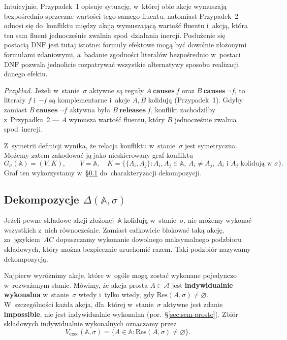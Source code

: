 \documentclass[11pt,a4paper]{article}
\newcommand{\causes}{\textbf{causes}}
\newcommand{\impossible}{\textbf{impossible}}
\newcommand{\releases}{\textbf{releases}}
\newcommand{\DNF}{\mathrm{DNF}}
\theoremstyle{definition}
\begin{document}
\medskip
Intuicyjnie, Przypadek~1 opisuje sytuację, w~której obie akcje wymuszają
bezpośrednio sprzeczne wartości tego samego fluentu, natomiast Przypadek~2
odnosi się do~konfliktu między akcją wymuszającą wartość fluentu i~akcją,
która ten sam fluent jednocześnie zwalnia spod~działania inercji.
Posłużenie się postacią $\DNF$ jest tutaj istotne: formuły efektowe mogą
być dowolnie złożonymi formułami zdaniowymi, a~badanie zgodności literałów
bezpośrednio w~postaci $\DNF$ pozwala jednolicie rozpatrywać wszystkie
alternatywy sposobu realizacji danego efektu.

\smallskip\noindent\emph{Przykład.}
Jeżeli w~stanie~$\sigma$ aktywne są reguły $A\ \causes\ f$ oraz $B\ \causes\ \neg f$,
to literały $f$ i~$\neg f$ są komplementarne i~akcje $A, B$ kolidują (Przypadek~1).
Gdyby zamiast $B\ \causes\ \neg f$ aktywna była $B\ \releases\ f$, konflikt zachodziłby
z~Przypadku~2 --- $A$ wymusza wartość fluentu, który $B$ jednocześnie zwalnia spod~inercji.

Z~symetrii definicji wynika, że relacja konfliktu w~stanie~$\sigma$
jest symetryczna. Możemy zatem zakodować ją jako nieskierowany graf
konfliktu
\[
  G_\sigma(\mathbb{A}) = (V, K),
  \qquad V = \mathbb{A},
  \quad
  K = \{\{A_i, A_j\} : A_i, A_j \in \mathbb{A},\ A_i \neq A_j,
        \ A_i \text{ i } A_j \text{ kolidują w~} \sigma\}.
\]
Graf ten wykorzystamy w~\S\ref{sec:dekompozycje} do~charakteryzacji
dekompozycji.

\subsection{Dekompozycje \texorpdfstring{$\Delta(\mathbb{A}, \sigma)$}{Delta(A,sigma)}}
\label{sec:dekompozycje}

Jeżeli pewne składowe akcji złożonej~$\mathbb{A}$ kolidują w~stanie~$\sigma$,
nie możemy wykonać wszystkich z~nich równocześnie. Zamiast całkowicie
blokować taką akcję, za~językiem~$AC$ dopuszczamy wykonanie dowolnego
maksymalnego podzbioru składowych, który można bezpiecznie uruchomić
razem. Taki podzbiór nazywamy dekompozycją.

Najpierw wyróżnimy akcje, które w~ogóle mogą zostać wykonane pojedynczo
w~rozważanym stanie. Mówimy, że akcja prosta $A \in \mathcal{A}$ jest
\textbf{indywidualnie wykonalna} w~stanie~$\sigma$ wtedy i~tylko wtedy,
gdy $\mathrm{Res}(A,\sigma) \neq \varnothing$. W~szczególności każda
akcja, dla~której w~stanie~$\sigma$ aktywne jest zdanie \impossible{},
nie jest indywidualnie wykonalna (por.~\S\ref{sec:sem-proste}). Zbiór składowych
indywidualnie wykonalnych oznaczamy przez
\[
  V_{\mathrm{exec}}(\mathbb{A},\sigma)
    = \{A \in \mathbb{A} : \mathrm{Res}(A,\sigma) \neq \varnothing\}.
\]
\end{document}
